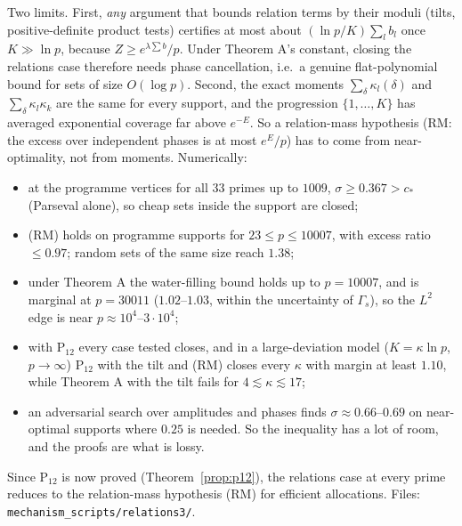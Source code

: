 \documentclass[11pt]{article}
\theoremstyle{definition}
\begin{document}
Two limits.  First, \emph{any} argument that bounds relation terms by their moduli (tilts, positive-definite product tests) certifies at most about
$(\ln p/K)\sum_lb_l$ once $K\gg\ln p$, because $Z\ge e^{\lambda\sum b}/p$.  Under Theorem A's constant, closing the relations case therefore needs phase
cancellation, i.e.\ a genuine flat-polynomial bound for sets of size $O(\log p)$.  Second, the exact moments $\sum_\delta\kappa_l(\delta)$ and
$\sum_\delta\kappa_l\kappa_k$ are the same for every support, and the progression $\{1,\dots,K\}$ has averaged exponential coverage far above
$e^{-E}$.  So a relation-mass hypothesis (RM: the excess over independent phases is at most $e^E/p$) has to come from near-optimality, not from moments.
Numerically:
\begin{itemize}
\item at the programme vertices for all $33$ primes up to $1009$, $\sigma\ge0.367>c_*$ (Parseval alone), so cheap sets inside the support are closed;
\item (RM) holds on programme supports for $23\le p\le10007$, with excess ratio $\le0.97$; random sets of the same size reach $1.38$;
\item under Theorem A the water-filling bound holds up to $p=10007$, and is marginal at $p=30011$ ($1.02$--$1.03$, within the uncertainty of $\Gamma_s$), so the
$L^2$ edge is near $p\approx10^4$--$3\cdot10^4$;
\item with P$_{12}$ every case tested closes, and in a large-deviation model ($K=\kappa\ln p$, $p\to\infty$) P$_{12}$ with the tilt and (RM) closes every $\kappa$
with margin at least $1.10$, while Theorem A with the tilt fails for $4\lesssim\kappa\lesssim17$;
\item an adversarial search over amplitudes and phases finds $\sigma\approx0.66$--$0.69$ on near-optimal supports where $0.25$ is needed.  So the inequality has a lot of room, and the
proofs are what is lossy.
\end{itemize}
Since P$_{12}$ is now proved (Theorem~\ref{prop:p12}), the relations case at every prime reduces to the relation-mass hypothesis (RM) for efficient allocations.
Files: \texttt{mechanism\_scripts/relations3/}.
\end{document}
